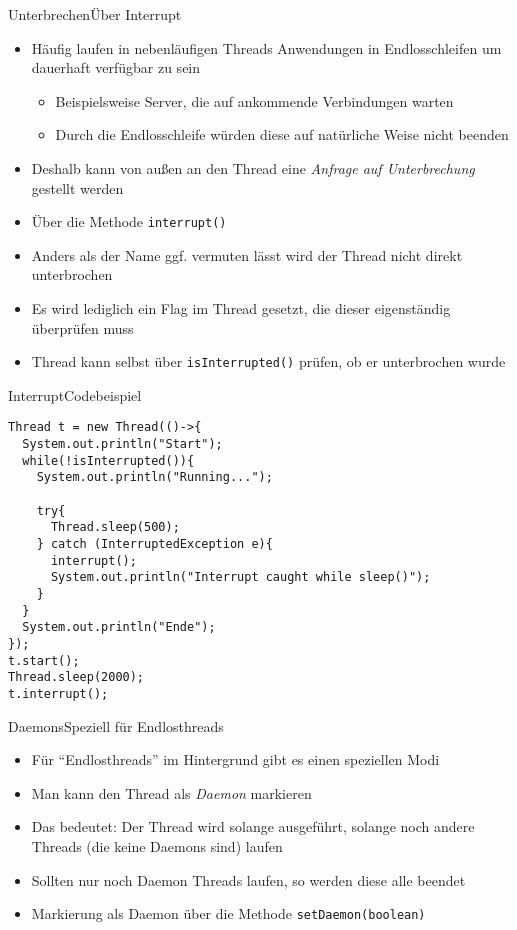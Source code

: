 \begin{frame}{Unterbrechen}{Über Interrupt}
    \begin{itemize}
        \item Häufig laufen in nebenläufigen Threads Anwendungen in Endlosschleifen um dauerhaft verfügbar zu sein
        \begin{itemize}
            \item Beispielsweise Server, die auf ankommende Verbindungen warten
            \item Durch die Endlosschleife würden diese auf natürliche Weise nicht beenden
        \end{itemize}
        \item Deshalb kann von außen an den Thread eine \textit{Anfrage auf Unterbrechung} gestellt werden
        \item Über die Methode \texttt{interrupt()}
        \item Anders als der Name ggf. vermuten lässt wird der Thread nicht direkt unterbrochen
        \item Es wird lediglich ein Flag im Thread gesetzt, die dieser eigenständig überprüfen muss
        \item Thread kann selbst über \texttt{isInterrupted()} prüfen, ob er unterbrochen wurde
    \end{itemize}
\end{frame}

\begin{frame}[fragile]{Interrupt}{Codebeispiel}
\lstset{style=java}
\begin{lstlisting}
Thread t = new Thread(()->{
  System.out.println("Start");
  while(!isInterrupted()){
    System.out.println("Running...");
  
    try{
      Thread.sleep(500);
    } catch (InterruptedException e){
      interrupt();
      System.out.println("Interrupt caught while sleep()");
    }
  }
  System.out.println("Ende");
});
t.start();
Thread.sleep(2000);
t.interrupt();
\end{lstlisting}
\end{frame}

\begin{frame}{Daemons}{Speziell für Endlosthreads}
    \begin{itemize}
        \item Für "`Endlosthreads"' im Hintergrund gibt es einen speziellen Modi
        \item Man kann den Thread als \textit{Daemon} markieren
        \item Das bedeutet: Der Thread wird solange ausgeführt, solange noch andere Threads (die keine Daemons sind) laufen
        \item Sollten nur noch Daemon Threads laufen, so werden diese alle beendet
        \item Markierung als Daemon über die Methode \texttt{setDaemon(boolean)}
    \end{itemize}
\end{frame}

